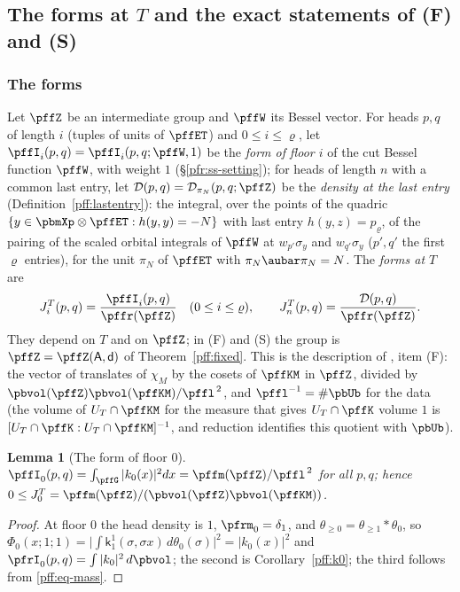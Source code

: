 \documentclass[10pt]{amsart}
\newtheorem{lemma}[theorem]{Lemma}
\theoremstyle{definition}
\theoremstyle{remark}
\begin{document}
\subsection{The forms at $T$ and the exact statements of \textup{(F)} and \textup{(S)}}\label{pff:ss-statements}

\subsubsection*{The forms}
Let $\pffZ$ be an intermediate group and $\pffW$ its Bessel vector. For heads $p,q$ of length $i$
(tuples of units of $\pffET$) and $0\le i\le\varrho$, let $\pffI_i(p,q)=\pffI_i(p,q;\pffW,1)$ be the
\emph{form of floor $i$} of the cut Bessel function $\pffW$, with weight $1$
(\S\ref{pfr:ss-setting}); for heads of length $n$ with a common last entry, let
$\mathcal D(p,q)=\mathcal D_{\pi_N}(p,q;\pffZ)$ be the \emph{density at the last entry}
(Definition~\ref{pff:lastentry}): the integral, over the points of the quadric $\{y\in\pbmXp\otimes
\pffET:h(y,y)=-N\}$ with last entry $h(y,z)=p_\varrho$, of the pairing of the scaled orbital
integrals of $\pffW$ at $w_{p'}\sigma_y$ and $w_{q'}\sigma_y$ ($p',q'$ the first $\varrho$ entries),
for the unit $\pi_N$ of $\pffET$ with $\pi_N\aubar\pi_N=N$. The \emph{forms at $T$} are
\begin{equation}\label{pff:eq-forms}
J^T_i(p,q)=\frac{\pffI_i(p,q)}{\pffr(\pffZ)}\quad(0\le i\le\varrho),\qquad J^T_n(p,q)=
\frac{\mathcal D(p,q)}{\pffr(\pffZ)} .
\end{equation}
They depend on $T$ and on $\pffZ$; in \textup{(F)} and \textup{(S)} the group is
$\pffZ=\pffZ(\mathsf A,\mathsf d)$ of Theorem~\ref{pff:fixed}. This is the description of
{\cite[\S3.3.7]{P51}}, item \textup{(F)}: the vector of translates of $\chi_M$ by the cosets of
$\pffKM$ in $\pffZ$, divided by $\pbvol(\pffZ)\pbvol(\pffKM)/\pffl^{\,2}$, and $\pffl^{-1}=\#\pbUb$
for the data (the volume of $U_T\cap\pffKM$ for the measure that gives $U_T\cap\pffK$ volume $1$ is
$[U_T\cap\pffK:U_T\cap\pffKM]^{-1}$, and reduction identifies this quotient with $\pbUb$).

\begin{lemma}[The form of floor $0$]\label{pff:J0}
$\pffI_0(p,q)=\int_{\pffG}|k_0(x)|^2dx=\pffm(\pffZ)/\pffl^{\,2}$ for all $p,q$; hence
$0\le J^T_0=\pffm(\pffZ)/(\pbvol(\pffZ)\pbvol(\pffKM))$.
\end{lemma}
\begin{proof}
At floor $0$ the head density is $1$, $\pfrm_0=\delta_1$, and $\theta_{\ge0}=\theta_{\ge1}\ast
\theta_0$, so $\Phi_0(x;1;1)=\bigl|\int\mathsf k^1_1(\sigma,\sigma x)\,d\theta_0(\sigma)\bigr|^2=|k_0(x)|^2$
and $\pfrI_0(p,q)=\int|k_0|^2\,d\pbvol$; the second is
Corollary~\ref{pff:k0}; the third follows from \eqref{pff:eq-mass}.
\end{proof}
\end{document}
